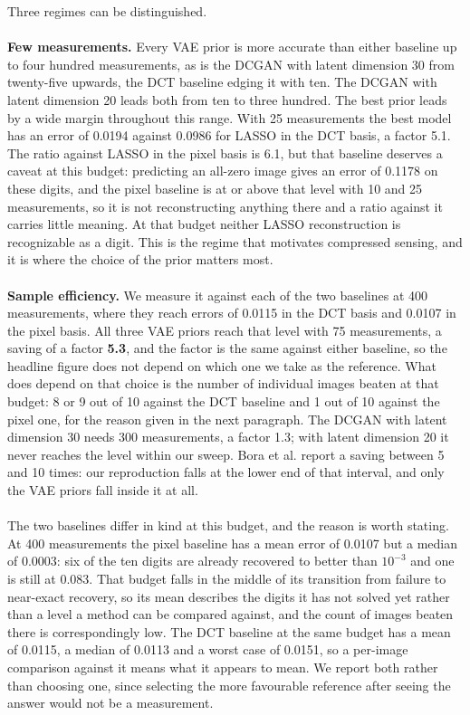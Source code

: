 Three regimes can be distinguished.
\\\\
\textbf{Few measurements.} Every VAE prior is more accurate than either baseline up to four hundred measurements, as is the DCGAN with latent dimension 30 from twenty-five upwards, the DCT baseline edging it with ten. The DCGAN with latent dimension 20 leads both from ten to three hundred. The best prior leads by a wide margin throughout this range. With 25 measurements the best model has an error of 0.0194 against 0.0986 for LASSO in the DCT basis, a factor 5.1. The ratio against LASSO in the pixel basis is 6.1, but that baseline deserves a caveat at this budget: predicting an all-zero image gives an error of 0.1178 on these digits, and the pixel baseline is at or above that level with 10 and 25 measurements, so it is not reconstructing anything there and a ratio against it carries little meaning. At that budget neither LASSO reconstruction is recognizable as a digit. This is the regime that motivates compressed sensing, and it is where the choice of the prior matters most.
\\\\
\textbf{Sample efficiency.} We measure it against each of the two baselines at 400 measurements, where they reach errors of 0.0115 in the DCT basis and 0.0107 in the pixel basis. All three VAE priors reach that level with 75 measurements, a saving of a factor \textbf{5.3}, and the factor is the same against either baseline, so the headline figure does not depend on which one we take as the reference. What does depend on that choice is the number of individual images beaten at that budget: 8 or 9 out of 10 against the DCT baseline and 1 out of 10 against the pixel one, for the reason given in the next paragraph. The DCGAN with latent dimension 30 needs 300 measurements, a factor 1.3; with latent dimension 20 it never reaches the level within our sweep. Bora et al. report a saving between 5 and 10 times: our reproduction falls at the lower end of that interval, and only the VAE priors fall inside it at all.
\\\\
The two baselines differ in kind at this budget, and the reason is worth stating. At 400 measurements the pixel baseline has a mean error of 0.0107 but a median of 0.0003: six of the ten digits are already recovered to better than \( 10^{-3} \) and one is still at 0.083. That budget falls in the middle of its transition from failure to near-exact recovery, so its mean describes the digits it has not solved yet rather than a level a method can be compared against, and the count of images beaten there is correspondingly low. The DCT baseline at the same budget has a mean of 0.0115, a median of 0.0113 and a worst case of 0.0151, so a per-image comparison against it means what it appears to mean. We report both rather than choosing one, since selecting the more favourable reference after seeing the answer would not be a measurement.
